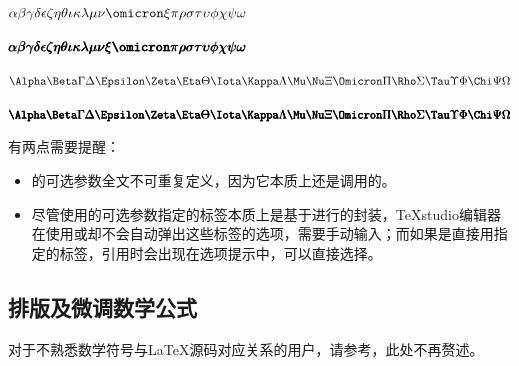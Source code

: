 \documentclass[QingNianC, vlined, timesmathnogreek]{nsfc}
\begin{document}
	$ \alpha \beta \gamma \delta \epsilon \zeta \eta \theta \iota \kappa \lambda \mu \nu \omicron \xi \pi \rho \sigma \tau \upsilon \phi \chi \psi \omega$

	$ \boldsymbol{\alpha} \boldsymbol{\beta} \boldsymbol{\gamma} \boldsymbol{\delta} \boldsymbol{\epsilon} \boldsymbol{\zeta} \boldsymbol{\eta} \boldsymbol{\theta} \boldsymbol{\iota} \boldsymbol{\kappa} \boldsymbol{\lambda} \boldsymbol{\mu} \boldsymbol{\nu} \boldsymbol{\xi} \boldsymbol{\omicron} \boldsymbol{\pi} \boldsymbol{\rho} \boldsymbol{\sigma} \boldsymbol{\tau} \boldsymbol{\upsilon} \boldsymbol{\phi} \boldsymbol{\chi} \boldsymbol{\psi} \boldsymbol{\omega}$

	$ \Alpha \Beta \Gamma \Delta \Epsilon \Zeta \Eta \Theta \Iota \Kappa \Lambda \Mu \Nu \Xi \Omicron \Pi \Rho \Sigma \Tau \Upsilon \Phi \Chi \Psi \Omega$
	
	$ \boldsymbol{\Alpha} \boldsymbol{\Beta} \boldsymbol{\Gamma} \boldsymbol{\Delta} \boldsymbol{\Epsilon} \boldsymbol{\Zeta} \boldsymbol{\Eta} \boldsymbol{\Theta} \boldsymbol{\Iota} \boldsymbol{\Kappa} \boldsymbol{\Lambda} \boldsymbol{\Mu} \boldsymbol{\Nu} \boldsymbol{\Xi} \boldsymbol{\Omicron} \boldsymbol{\Pi} \boldsymbol{\Rho} \boldsymbol{\Sigma} \boldsymbol{\Tau} \boldsymbol{\Upsilon} \boldsymbol{\Phi} \boldsymbol{\Chi} \boldsymbol{\Psi} \boldsymbol{\Omega}$
	
	有两点需要提醒：
	\begin{itemize}
		\item {}的可选参数全文不可重复定义，因为它本质上还是调用的。
		\item 尽管使用的可选参数指定的标签本质上是基于进行的封装，TeXstudio编辑器在使用或却不会自动弹出这些标签的选项，需要手动输入；而如果是直接用指定的标签，引用时会出现在选项提示中，可以直接选择。
	\end{itemize}
	
	
	\subsection{排版及微调数学公式}

	对于不熟悉数学符号与LaTeX源码对应关系的用户，请参考\href{https://www.cnblogs.com/1024th/p/11623258.html}{\color{DarkRed}}，此处不再赘述。
\end{document}
